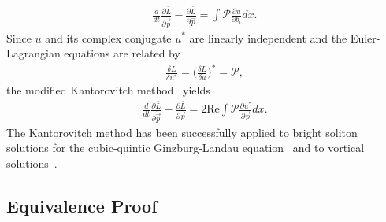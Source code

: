 \begin{align}
\frac{d}{dt} \frac{\partial \bar{L} }{\partial \dot{\vec{p}}} - \frac{\partial \bar{L}  }{\partial \vec{p} } = \int \mathcal{P} \frac{\partial u}{\partial b_i} dx. 
\end{align}
Since $u$ and its complex conjugate $u^*$ are linearly independent and the Euler-Lagrangian equations are related by
\begin{align}
\frac{\delta L}{\delta u^* } = \Bigg(\frac{\delta L }{\delta u}\Bigg)^* = \mathcal{P},
\end{align}
the modified Kantorovitch method~\cite{ref3} yields
\begin{align}
\frac{d}{dt} \frac{\partial \bar{L} }{\partial \dot{\vec{p}}} - \frac{\partial \bar{L}  }{\partial \vec{p}} = 2 \mathrm{Re} \int \mathcal{P} \frac{\partial u^*}{\partial \vec{p}} dx. 
\label{eq:Kantorovitch}
\end{align}
The Kantorovitch method has been successfully applied to bright
soliton solutions for the cubic-quintic Ginzburg-Landau equation~\cite{Skarka:06} and to vortical solutions~\cite{Skarka:10,Skarka:14}.

\subsection{Equivalence Proof} \label{sec:Equivalence}

